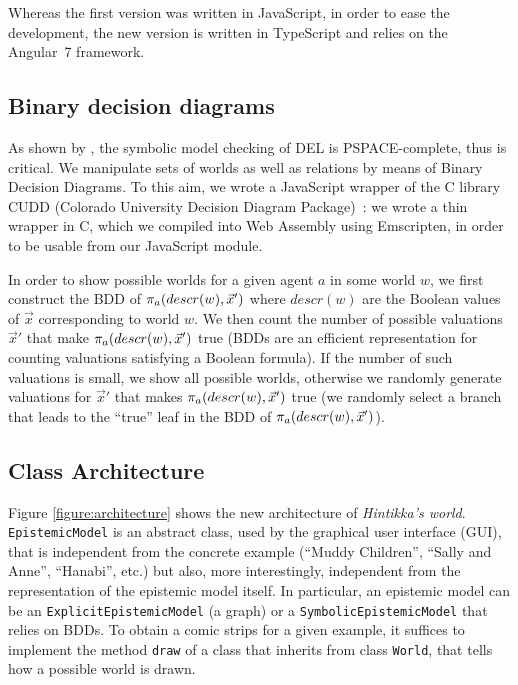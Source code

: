 
Whereas the first version was written in JavaScript, in order to ease the development, the new version is written in TypeScript and relies on the Angular~7 framework.

\subsection{Binary decision diagrams}

As shown by \citet{DBLP:conf/atal/CharrierS17}, the symbolic model checking of DEL is PSPACE-complete, thus is critical. We manipulate sets of worlds as well as relations by means of Binary Decision Diagrams. To this aim, we wrote a JavaScript wrapper of the C library CUDD (Colorado University Decision Diagram Package)~\cite{DBLP:journals/sttt/Somenzi01}: we wrote a thin wrapper in C, which we compiled into Web Assembly using Emscripten, in order to be usable from our JavaScript module.

In order to show possible worlds for a given agent $a$ in some world $w$, we first construct the BDD of $\pi_{a}(descr(w), \vec x')$ where $descr(w)$ are the Boolean values of $\vec x$ corresponding to world $w$. We then count the number of possible valuations $\vec x'$ that make $\pi_{a}(descr(w), \vec x')$ true (BDDs are an efficient representation for counting valuations satisfying a Boolean formula). If the number of such valuations is small, we show all possible worlds, otherwise we randomly generate valuations for $\vec x'$ that makes $\pi_{a}(descr(w), \vec x')$ true (we randomly select a branch that leads to the ``true'' leaf in the BDD of $\pi_{a}(descr(w), \vec x')$).

\subsection{Class Architecture}

Figure \ref{figure:architecture} shows the new architecture of \emph{Hintikka's world}. \texttt{EpistemicModel} is an abstract class, used by the graphical user interface (GUI), that is independent from the concrete example (``Muddy Children'', ``Sally and Anne'', ``Hanabi'', etc.) but also, more interestingly, independent from the representation of the epistemic model itself. In particular, an epistemic model can be an \texttt{ExplicitEpistemicModel} (a graph) or a \texttt{SymbolicEpistemicModel} that relies on BDDs. To obtain a comic strips for a given example, it suffices to implement the method \texttt{draw} of a class that inherits from class \texttt{World}, that tells how a possible world is drawn.


